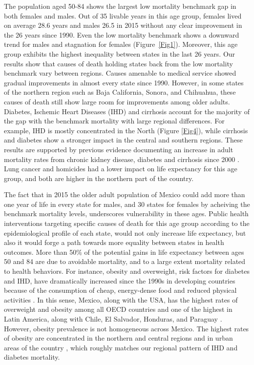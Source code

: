 \documentclass{bmcart}
\begin{document}
The population aged 50-84 shows the largest low mortality benchmark gap in both females and males. Out of 35 livable years in this age group, females lived on average 28.6 years and males 26.5 in 2015 without any clear improvement in the 26 years since 1990. Even the low mortality benchmark shows a downward trend for males and stagnation for females (Figure~\ref{Fig1}). Moreover, this age group exhibits the highest inequality between states in the last 26 years. Our results show that causes of death holding states back from the low mortality benchmark vary between regions. Causes amenable to medical service showed gradual improvements in almost every state since 1990. However, in some states of the northern region such as Baja California, Sonora, and Chihuahua, these causes of death still show large room for improvements among older adults. Diabetes, Ischemic Heart Diseases (IHD) and cirrhosis account for the majority of the gap with the benchmark mortality with large regional differences. For example, IHD is mostly concentrated in the North (Figure \ref{Fig4}), while cirrhosis and diabetes show a stronger impact in the central and southern regions. These results are supported by previous evidence documenting an increase in adult mortality rates from chronic kidney disease, diabetes and cirrhosis since 2000 \cite{gomez2016dissonant}. Lung cancer and homicides had a lower impact on life expectancy for this age group, and both are higher in the northern part of the country. 

The fact that in 2015 the older adult population of Mexico could add more than one year of life in every state for males, and 30 states for females by acheiving the benchmark mortality levels, underscores vulnerability in these ages. Public health interventions targeting specific causes of death for this age group according to the epidemiological profile of each state, would not only increase life expectancy, but also it would forge a path towards more equality between states in health outcomes. More than 50\% of the potential gains in life expectancy between ages 50 and 84 are due to avoidable mortality, and to a large extent mortality related to health behaviors. For instance, obesity and overweight, risk factors for diabetes and IHD, have dramatically increased since the 1990s in developing countries because of the consumption of cheap, energy-dense food and reduced physical activities \cite{hossain2007obesity}. In this sense, Mexico, along with the USA, has the highest rates of overweight and obesity among all OECD countries  \cite{gonzalez2016mexico} and one of the highest in Latin America, along with Chile, El Salvador, Honduras, and Paraguay \cite{aschner2016obesity}. However, obesity prevalence is not homogeneous across Mexico. The highest rates of obesity are concentrated in the northern and central regions \cite{gonzalez2016mexico} and in urban areas of the country \cite{kuri2009prevalence}, which roughly matches our regional pattern of IHD and diabetes mortality.
\end{document}
